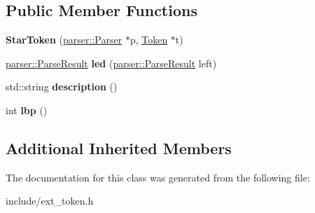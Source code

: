 \subsection*{Public Member Functions}
\begin{DoxyCompactItemize}
\item 
{\bfseries Star\+Token} (\hyperlink{classfcal_1_1parser_1_1Parser}{parser\+::\+Parser} $\ast$p, \hyperlink{classfcal_1_1scanner_1_1Token}{Token} $\ast$t)\hypertarget{classfcal_1_1scanner_1_1StarToken_a433855ee8677eeab179e361f48535aec}{}\label{classfcal_1_1scanner_1_1StarToken_a433855ee8677eeab179e361f48535aec}

\item 
\hyperlink{classfcal_1_1parser_1_1ParseResult}{parser\+::\+Parse\+Result} {\bfseries led} (\hyperlink{classfcal_1_1parser_1_1ParseResult}{parser\+::\+Parse\+Result} left)\hypertarget{classfcal_1_1scanner_1_1StarToken_a6b11cdc86dbaba80202ebc5ad8939a01}{}\label{classfcal_1_1scanner_1_1StarToken_a6b11cdc86dbaba80202ebc5ad8939a01}

\item 
std\+::string {\bfseries description} ()\hypertarget{classfcal_1_1scanner_1_1StarToken_ab7d27896f41f930e7a17126fc014d440}{}\label{classfcal_1_1scanner_1_1StarToken_ab7d27896f41f930e7a17126fc014d440}

\item 
int {\bfseries lbp} ()\hypertarget{classfcal_1_1scanner_1_1StarToken_a20ae85b6c5a2ad7b7fb249974af2479d}{}\label{classfcal_1_1scanner_1_1StarToken_a20ae85b6c5a2ad7b7fb249974af2479d}

\end{DoxyCompactItemize}
\subsection*{Additional Inherited Members}


The documentation for this class was generated from the following file\+:\begin{DoxyCompactItemize}
\item 
include/ext\+\_\+token.\+h\end{DoxyCompactItemize}
